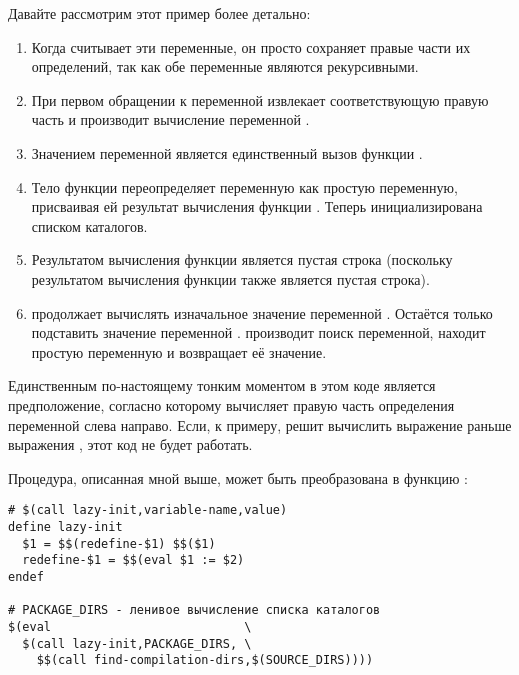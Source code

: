 Давайте рассмотрим этот пример более детально:
\begin{enumerate}
\item Когда \GNUmake{} считывает эти переменные, он просто сохраняет
правые части их определений, так как обе переменные являются
рекурсивными.
\item При первом обращении к переменной 
\GNUmake{} извлекает соответствующую правую часть и производит
вычисление переменной .
\item Значением переменной 
является единственный вызов функции .
\item Тело функции  переопределяет переменную
 как простую переменную, присваивая ей
результат вычисления функции
. Теперь
 инициализирована списком каталогов.
\item Результатом вычисления функции
 является пустая строка
(поскольку результатом вычисления функции  также
является пустая строка).
\item \GNUmake{} продолжает вычислять изначальное значение переменной
. Остаётся только подставить значение
переменной . \GNUmake{} производит поиск
переменной, находит простую переменную и возвращает её значение.
\end{enumerate}

Единственным по-настоящему тонким моментом в этом коде является
предположение, согласно которому \GNUmake{} вычисляет правую часть
определения переменной слева направо. Если, к примеру, \GNUmake{}
решит вычислить выражение  раньше выражения
, этот код не будет
работать.

Процедура, описанная мной выше, может быть преобразована в функцию
:

{\footnotesize
\begin{verbatim}
# $(call lazy-init,variable-name,value)
define lazy-init
  $1 = $$(redefine-$1) $$($1)
  redefine-$1 = $$(eval $1 := $2)
endef

# PACKAGE_DIRS - ленивое вычисление списка каталогов
$(eval                           \
  $(call lazy-init,PACKAGE_DIRS, \
    $$(call find-compilation-dirs,$(SOURCE_DIRS))))
\end{verbatim}
}

